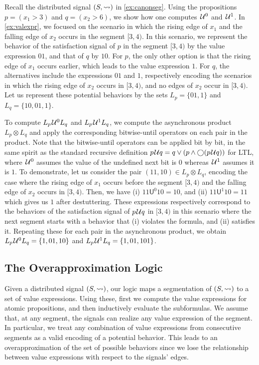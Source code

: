 \begin{example} \label{ex:bitwiseuntil}
	Recall the distributed signal $(S, {\rightsquigarrow})$ in \cref{ex:canonseg}.
	Using the propositions $p = (x_1 > 3)$ and $q = (x_2 > 6)$, we show how one computes $\kern.1em\mathcal{U}^0$ and $\kern.1em\mathcal{U}^1$.
	In \cref{ex:valexpr}, we focused on the scenario in which the rising edge of $x_1$ and the falling edge of $x_2$ occurs in the segment $[3,4)$.
	In this scenario, we represent the behavior of the satisfaction signal of $p$ in the segment $[3,4)$ by the value expression $01$, and that of $q$ by $10$.
	For $p$, the only other option is that the rising edge of $x_1$ occurs earlier, which leads to the value expression $1$.
	For $q$, the alternatives include the expressions $01$ and $1$, respectively encoding the scenarios in which the rising edge of $x_2$ occurs in $[3,4)$, and no edges of $x_2$ occur in $[3,4)$.
	Let us represent these potential behaviors by the sets $L_p = \{ 01, 1 \}$ and $L_q = \{ 10, 01, 1\}$.

	To compute $L_p \kern.1em\mathcal{U}^0 L_q$ and $L_p \kern.1em\mathcal{U}^1 L_q$, we compute the asynchronous product $L_p \otimes L_q$ and apply the corresponding bitwise-until operators on each pair in the product.
	Note that the bitwise-until operators can be applied bit by bit, in the same spirit as the standard recursive definition $p \kern.1em\mathcal{U} q = q \lor (p \land \bigcirc (p \kern.1em\mathcal{U} q))$ for LTL, where $\kern.1em\mathcal{U}^0$ assumes the value of the undefined next bit is $0$ whereas $\kern.1em\mathcal{U}^1$ assumes it is $1$.
	To demonstrate, let us consider the pair $(11,10) \in L_p \otimes L_q$, encoding the case where the rising edge of $x_1$ occurs before the segment $[3,4)$ and the falling edge of $x_2$ occurs in $[3,4)$.
	Then, we have (i) $11 \mathsf{U}^0 10 = 10$, and (ii) $11 \mathsf{U}^1 10 = 11$ which gives us $1$ after destuttering.
	These expressions respectively correspond to the behaviors of the satisfaction signal of $p \kern.1em\mathcal{U} q$ in $[3,4)$ in this scenario where the next segment starts with a behavior that (i) violates the formula, and (ii) satisfies it.
	Repeating these for each pair in the asynchronous product, we obtain $L_p \kern.1em\mathcal{U}^0 L_q = \{1, 01, 10 \}$ and $L_p \kern.1em\mathcal{U}^1 L_q = \{1, 01, 101 \}$.
\end{example}

\subsection{The Overapproximation Logic}
Given a distributed signal $(S,{\rightsquigarrow})$, our logic maps a segmentation of $(S,{\rightsquigarrow})$ to a set of value expressions.
Using these, first we compute the value expressions for atomic propositions, and then inductively evaluate the subformulas.
We assume that, at any segment, the signals can realize any value expression of the segment.
In particular, we treat any combination of value expressions from consecutive segments as a valid encoding of a potential behavior.
This leads to an overapproximation of the set of possible behaviors since we lose the relationship between value expressions with respect to the signals' edges.

